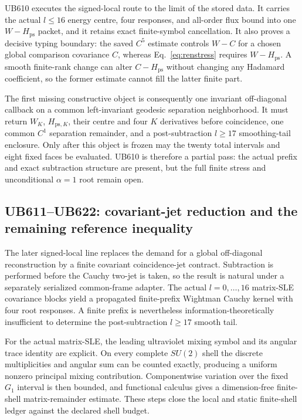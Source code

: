 \documentclass[11pt]{article}
\theoremstyle{definition}
\theoremstyle{remark}
\begin{document}
UB610 executes the signed-local route to the limit of the stored data. It carries the actual $l\le16$ energy centre, four responses, and all-order flux bound into one $W-H_{\mathrm{ps}}$ packet, and it retains exact finite-symbol cancellation. It also proves a decisive typing boundary: the saved $C^5$ estimate controls $W-C$ for a chosen global comparison covariance $C$, whereas Eq.~\eqref{eq:renstress} requires $W-H_{\mathrm{ps}}$. A smooth finite-rank change can alter $C-H_{\mathrm{ps}}$ without changing any Hadamard coefficient, so the former estimate cannot fill the latter finite part.

The first missing constructive object is consequently one invariant off-diagonal callback on a common left-invariant geodesic separation neighborhood. It must return $W_K$, $H_{\mathrm{ps},K}$, their centre and four $K$ derivatives before coincidence, one common $C^1$ separation remainder, and a post-subtraction $l\ge17$ smoothing-tail enclosure. Only after this object is frozen may the twenty total intervals and eight fixed faces be evaluated. UB610 is therefore a partial pass: the actual prefix and exact subtraction structure are present, but the full finite stress and unconditional $\alpha=1$ root remain open.

\subsection{UB611--UB622: covariant-jet reduction and the remaining reference inequality}

The later signed-local line replaces the demand for a global off-diagonal reconstruction by a finite covariant coincidence-jet contract. Subtraction is performed before the Cauchy two-jet is taken, so the result is natural under a separately serialized common-frame adapter. The actual $l=0,\ldots,16$ matrix-SLE covariance blocks yield a propagated finite-prefix Wightman Cauchy kernel with four root responses. A finite prefix is nevertheless information-theoretically insufficient to determine the post-subtraction $l\ge17$ smooth tail.

For the actual matrix-SLE, the leading ultraviolet mixing symbol and its angular trace identity are explicit. On every complete $SU(2)$ shell the discrete multiplicities and angular sum can be counted exactly, producing a uniform nonzero principal mixing contribution. Componentwise variation over the fixed $G_1$ interval is then bounded, and functional calculus gives a dimension-free finite-shell matrix-remainder estimate. These steps close the local and static finite-shell ledger against the declared shell budget.
\end{document}
